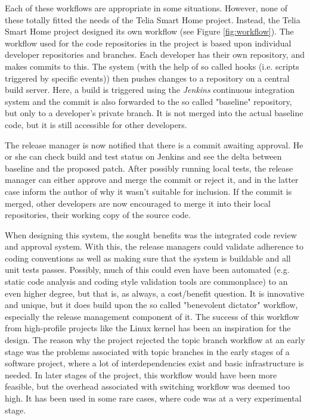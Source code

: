 \documentclass{llncs}
\begin{document}
Each of these workflows are appropriate in some situations. However,
none of these totally fitted the needs of the Telia Smart Home
project. Instead, the Telia Smart Home project designed its own
workflow (see Figure \ref{fig:workflow}). The workflow used for the
code repositories in the project is based upon individual developer
repositories and branches.  Each developer has their own repository,
and makes commits to this. The system (with the help of so called
hooks (i.e. scripts triggered by specific events)) then pushes changes
to a repository on a central build server. Here, a build is triggered
using the \emph{Jenkins} continuous integration system and the commit
is also forwarded to the so called "baseline" repository, but only to
a developer's private branch. It is not merged into the actual
baseline code, but it is still accessible for other developers.

The release manager is now notified that there is a commit awaiting
approval. He or she can check build and test status on Jenkins and see
the delta between baseline and the proposed patch. After possibly
running local tests, the release manager can either approve and merge
the commit or reject it, and in the latter case inform the author of
why it wasn't suitable for inclusion.  If the commit is merged, other
developers are now encouraged to merge it into their local
repositories, their working copy of the source code. 

When designing this system, the sought benefits was the integrated
code review and approval system. With this, the release managers could
validate adherence to coding conventions as well as making sure that
the system is buildable and all unit tests passes. Possibly, much of
this could even have been automated (e.g. static code analysis and
coding style validation tools are commonplace) to an even higher
degree, but that is, as always, a cost/benefit question. It is
innovative and unique, but it does build upon the so called
"benevolent dictator" workflow, especially the release management
component of it. The success of this workflow from high-profile
projects like the Linux kernel has been an inspiration for the design.
The reason why the project rejected the topic branch workflow at an
early stage was the problems associated with topic branches in the
early stages of a software project, where a lot of interdependencies
exist and basic infrastructure is needed. In later stages of the
project, this workflow would have been more feasible, but the overhead
associated with switching workflow was deemed too high. It has been
used in some rare cases, where code was at a very experimental stage.
\end{document}
